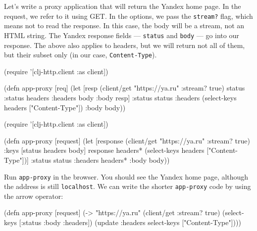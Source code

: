Let's write a proxy application that will return the Yandex home page. In the request, we refer to it using GET. In the options, we pass the \verb|stream?| flag, which means not to read the response. In this case, the body will be a stream, not an HTML string. The Yandex response fields — \verb|status| and \verb|body| — go into our response. The above also applies to headers, but we will return not all of them, but their subset only (in our case, \verb|Content-Type|).

\ifx\DEVICETYPE\MOBILE

\begin{english}
  \begin{clojure}
(require '[clj-http.client :as client])

(defn app-proxy [req]
  (let [resp (client/get "https://ya.ru"
                         {:stream? true})
        {status :status
         headers :headers
         body :body} resp]
    {:status status
     :headers (select-keys
                headers ["Content-Type"])
     :body body}))
  \end{clojure}
\end{english}

\else

\begin{english}
  \begin{clojure}
(require '[clj-http.client :as client])

(defn app-proxy [request]
  (let [response (client/get "https://ya.ru" {:stream? true})
        {:keys [status headers body]} response
        headers* (select-keys headers ["Content-Type"])]
    {:status status
     :headers headers*
     :body body}))
  \end{clojure}
\end{english}

\fi

Run \verb|app-proxy| in the browser. You should see the Yandex home page, although the address is still \verb|localhost|. We can write the shorter \verb|app-proxy| code by using the arrow operator:

\ifx\DEVICETYPE\MOBILE

\begin{english}
  \begin{clojure}
(defn app-proxy [request]
  (-> "https://ya.ru"
      (client/get {:stream? true})
      (select-keys [:status
                    :body :headers])
      (update :headers
        select-keys ["Content-Type"])))
  \end{clojure}
\end{english}

